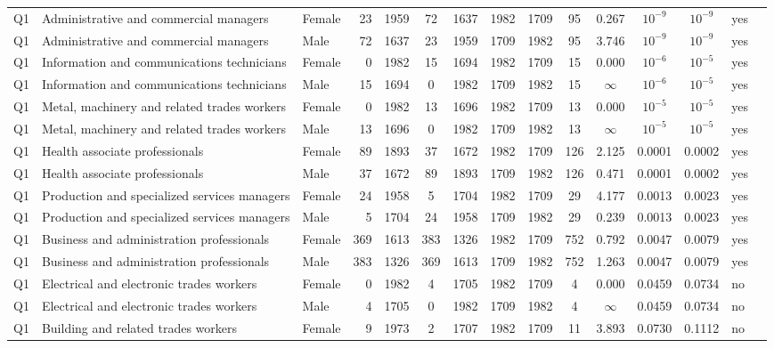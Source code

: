\begin{longtable}{lllrcccccccccll}
Q1 & Administrative and commercial managers & Female & 23 & 1959 & 72 & 1637 & 1982 & 1709 & 95 & 0.267 & $10^{-9}$ & $10^{-9}$ & yes \\
Q1 & Administrative and commercial managers & Male & 72 & 1637 & 23 & 1959 & 1709 & 1982 & 95 & 3.746 & $10^{-9}$ & $10^{-9}$ & yes \\
Q1 & Information and communications technicians & Female & 0 & 1982 & 15 & 1694 & 1982 & 1709 & 15 & 0.000 & $10^{-6}$ & $10^{-5}$ & yes \\
Q1 & Information and communications technicians & Male & 15 & 1694 & 0 & 1982 & 1709 & 1982 & 15 & $\infty$ & $10^{-6}$ & $10^{-5}$ & yes \\
Q1 & Metal, machinery and related trades workers & Female & 0 & 1982 & 13 & 1696 & 1982 & 1709 & 13 & 0.000 & $10^{-5}$ & $10^{-5}$ & yes \\
Q1 & Metal, machinery and related trades workers & Male & 13 & 1696 & 0 & 1982 & 1709 & 1982 & 13 & $\infty$ & $10^{-5}$ & $10^{-5}$ & yes \\
Q1 & Health associate professionals & Female & 89 & 1893 & 37 & 1672 & 1982 & 1709 & 126 & 2.125 & 0.0001 & 0.0002 & yes \\
Q1 & Health associate professionals & Male & 37 & 1672 & 89 & 1893 & 1709 & 1982 & 126 & 0.471 & 0.0001 & 0.0002 & yes \\
Q1 & Production and specialized services managers & Female & 24 & 1958 & 5 & 1704 & 1982 & 1709 & 29 & 4.177 & 0.0013 & 0.0023 & yes \\
Q1 & Production and specialized services managers & Male & 5 & 1704 & 24 & 1958 & 1709 & 1982 & 29 & 0.239 & 0.0013 & 0.0023 & yes \\
Q1 & Business and administration professionals & Female & 369 & 1613 & 383 & 1326 & 1982 & 1709 & 752 & 0.792 & 0.0047 & 0.0079 & yes \\
Q1 & Business and administration professionals & Male & 383 & 1326 & 369 & 1613 & 1709 & 1982 & 752 & 1.263 & 0.0047 & 0.0079 & yes \\
Q1 & Electrical and electronic trades workers & Female & 0 & 1982 & 4 & 1705 & 1982 & 1709 & 4 & 0.000 & 0.0459 & 0.0734 & no \\
Q1 & Electrical and electronic trades workers & Male & 4 & 1705 & 0 & 1982 & 1709 & 1982 & 4 & $\infty$ & 0.0459 & 0.0734 & no \\
Q1 & Building and related trades workers & Female & 9 & 1973 & 2 & 1707 & 1982 & 1709 & 11 & 3.893 & 0.0730 & 0.1112 & no \\

\end{longtable}
